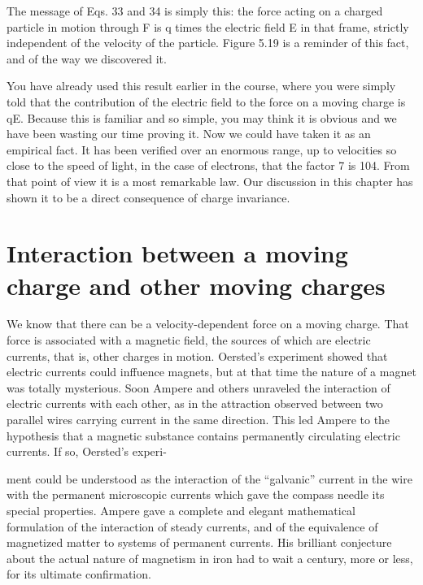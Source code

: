 \begin{equation}
\end{equation}

The message of Eqs. 33 and 34 is simply this: the force acting on a
charged particle in motion through F is q times the electric field E in
that frame, strictly independent of the velocity of the particle.
Figure 5.19 is a reminder of this fact, and of the way we discovered it.

You have already used this result earlier in the course, where you
were simply told that the contribution of the electric field to the force
on a moving charge is qE. Because this is familiar and so simple, you
may think it is obvious and we have been wasting our time proving it.
Now we could have taken it as an empirical fact. It has been verified
over an enormous range, up to velocities so close to the speed of light,
in the case of electrons, that the factor 7 is 104. From that point of
view it is a most remarkable law. Our discussion in this chapter has
shown it to be a direct consequence of charge invariance.

\section{Interaction between a moving charge and other moving charges}

We know that there can be a velocity-dependent force on a moving
charge. That force is associated with a magnetic field, the sources of
which are electric currents, that is, other charges in motion.
Oersted's experiment showed that electric currents could inffuence
magnets, but at that time the nature of a magnet was totally
mysterious. Soon Ampere and others unraveled the interaction of
electric currents with each other, as in the attraction observed between
two parallel wires carrying current in the same direction. This
led Ampere to the hypothesis that a magnetic substance contains
permanently circulating electric currents. If so, Oersted's experi-

ment could be understood as the interaction of the ``galvanic'' current
in the wire with the permanent microscopic currents which gave
the compass needle its special properties. Ampere gave a complete
and elegant mathematical formulation of the interaction of steady
currents, and of the equivalence of magnetized matter to systems of
permanent currents. His brilliant conjecture about the actual nature
of magnetism in iron had to wait a century, more or less, for its
ultimate confirmation.

